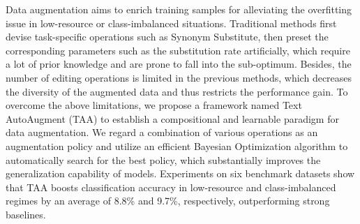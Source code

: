 Data augmentation aims to enrich training samples for alleviating the overfitting issue in low-resource or class-imbalanced situations. Traditional methods first devise task-specific operations such as Synonym Substitute, then preset the corresponding parameters such as the substitution rate artificially, which require a lot of prior knowledge and are prone to fall into the sub-optimum. Besides, the number of editing operations is limited in the previous methods, which decreases the diversity of the augmented data and thus restricts the performance gain. To overcome the above limitations, we propose a framework named Text AutoAugment (TAA) to establish a compositional and learnable paradigm for data augmentation. We regard a combination of various operations as an augmentation policy and utilize an efficient Bayesian Optimization algorithm to automatically search for the best policy, which substantially improves the generalization capability of models. Experiments on six benchmark datasets show that TAA boosts classification accuracy in low-resource and class-imbalanced regimes by an average of 8.8\% and 9.7\%, respectively, outperforming strong baselines.
